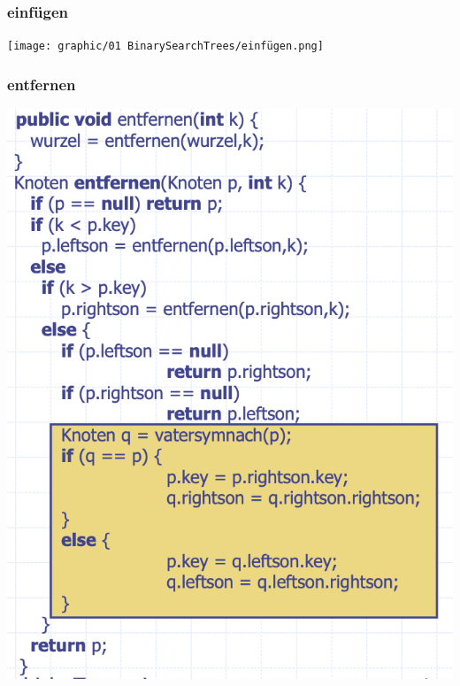 \subsubsection{einfügen}
\begin{center}
    \texttt{[image: graphic/01 BinarySearchTrees/einfügen.png]}
\end{center}
\vspace{-12pt}

\subsubsection{entfernen}
\begin{center}
    \includegraphics[scale=.3]{graphic/01 BinarySearchTrees/entfernen.png}
\end{center}
\vspace{-8pt}

